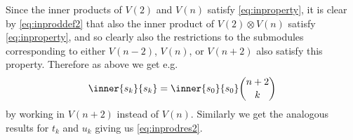 Since the inner products of $V(2)$ and $V(n)$ satisfy \cref{eq:inproperty}, it is clear by \cref{eq:inproddef2} that also the inner product of $V(2)\otimes V(n)$ satisfy \cref{eq:inproperty}, and so clearly also the restrictions to the submodules corresponding to either $V(n-2)$, $V(n)$, or $V(n+2)$ also satisfy this property. Therefore as above we get e.g.\
\begin{align*}
  \inner{s_k}{s_k} = \inner{s_0}{s_0}\binom{n+2}{k}
\end{align*}
by working in $V(n+2)$ instead of $V(n)$. Similarly we get the analogous results for $t_k$ and $u_k$ giving us \cref{eq:inprodres2}. 

